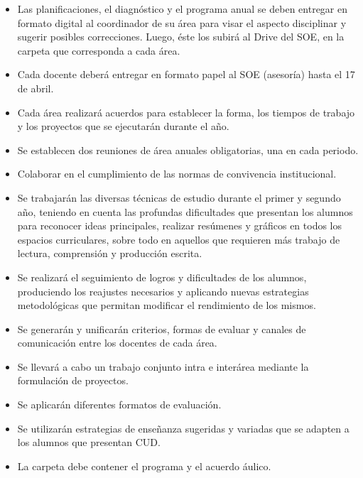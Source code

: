 \documentclass[../main]{subfiles}
\begin{document}
\begin{itemize}
    \item Las planificaciones, el diagnóstico y el programa anual se deben entregar en formato digital al coordinador de su área para visar el aspecto disciplinar y sugerir posibles correcciones. Luego, éste los subirá al Drive del SOE, en la carpeta que corresponda a cada área. 

\item Cada docente deberá entregar en formato papel al SOE (asesoría) hasta el 17 de abril. 

\item Cada área realizará acuerdos para establecer la forma, los tiempos de trabajo y los proyectos que se ejecutarán durante el año. 

\item Se establecen dos reuniones de área anuales obligatorias, una en cada periodo. 

\item Colaborar en el cumplimiento de las normas de convivencia institucional. 

\item Se trabajarán las diversas técnicas de estudio durante el primer y segundo año, teniendo en cuenta las profundas dificultades que presentan los alumnos para reconocer ideas principales, realizar resúmenes y gráficos en todos los espacios curriculares, sobre todo en aquellos que requieren más trabajo de lectura, comprensión y producción escrita.  

\item Se realizará el seguimiento de logros y dificultades de los alumnos, produciendo los reajustes necesarios y aplicando nuevas estrategias metodológicas que permitan modificar el rendimiento de los mismos. 

\item Se generarán y unificarán criterios, formas de evaluar y canales de comunicación entre los docentes de cada área. 

\item Se llevará a cabo un trabajo conjunto intra e interárea mediante la formulación de proyectos. 

\item Se aplicarán diferentes formatos de evaluación. 

\item Se utilizarán estrategias de enseñanza sugeridas y variadas que se adapten a los alumnos que presentan CUD. 

\item La carpeta debe contener el programa y el acuerdo áulico. 


\end{itemize}
\end{document}
